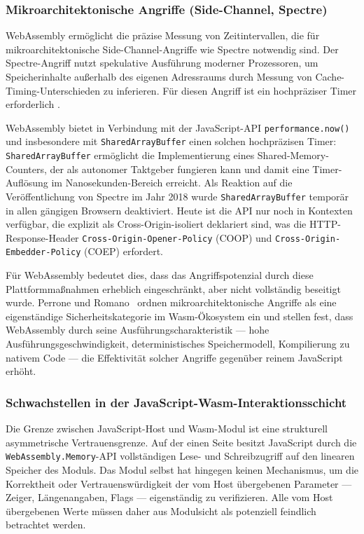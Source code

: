 \subsubsection{Mikroarchitektonische Angriffe (Side-Channel, Spectre)}

WebAssembly ermöglicht die präzise Messung von Zeitintervallen, die für mikroarchitektonische Side-Channel-Angriffe wie Spectre notwendig sind. Der Spectre-Angriff nutzt spekulative Ausführung moderner Prozessoren, um Speicherinhalte außerhalb des eigenen Adressraums durch Messung von Cache-Timing-Unterschieden zu inferieren. Für diesen Angriff ist ein hochpräziser Timer erforderlich \cite{PERRONE2025100728}.

WebAssembly bietet in Verbindung mit der JavaScript-API \texttt{performance.now()} und insbesondere mit \texttt{SharedArrayBuffer} einen solchen hochpräzisen Timer: \texttt{SharedArrayBuffer} ermöglicht die Implementierung eines Shared-Memory-Counters, der als autonomer Taktgeber fungieren kann und damit eine Timer-Auflösung im Nanosekunden-Bereich erreicht. Als Reaktion auf die Veröffentlichung von Spectre im Jahr 2018 wurde \texttt{SharedArrayBuffer} temporär in allen gängigen Browsern deaktiviert. Heute ist die API nur noch in Kontexten verfügbar, die explizit als Cross-Origin-isoliert deklariert sind, was die HTTP-Response-Header \texttt{Cross-Origin-Opener-Policy} (COOP) und \texttt{Cross-Origin-Embedder-Policy} (COEP) erfordert.

Für WebAssembly bedeutet dies, dass das Angriffspotenzial durch diese Plattformmaßnahmen erheblich eingeschränkt, aber nicht vollständig beseitigt wurde. Perrone und Romano~\cite{PERRONE2025100728} ordnen mikroarchitektonische Angriffe als eine eigenständige Sicherheitskategorie im Wasm-Ökosystem ein und stellen fest, dass WebAssembly durch seine Ausführungscharakteristik --- hohe Ausführungsgeschwindigkeit, deterministisches Speichermodell, Kompilierung zu nativem Code --- die Effektivität solcher Angriffe gegenüber reinem JavaScript erhöht.

\subsubsection{Schwachstellen in der JavaScript-Wasm-Interaktionsschicht}

Die Grenze zwischen JavaScript-Host und Wasm-Modul ist eine strukturell asymmetrische Vertrauensgrenze. Auf der einen Seite besitzt JavaScript durch die \texttt{WebAssembly.Memory}-API vollständigen Lese- und Schreibzugriff auf den linearen Speicher des Moduls. Das Modul selbst hat hingegen keinen Mechanismus, um die Korrektheit oder Vertrauenswürdigkeit der vom Host übergebenen Parameter --- Zeiger, Längenangaben, Flags --- eigenständig zu verifizieren. Alle vom Host übergebenen Werte müssen daher aus Modulsicht als potenziell feindlich betrachtet werden.

